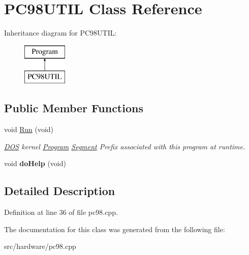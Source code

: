 \hypertarget{classPC98UTIL}{\section{P\-C98\-U\-T\-I\-L Class Reference}
\label{classPC98UTIL}
}
Inheritance diagram for P\-C98\-U\-T\-I\-L\-:\begin{figure}[H]
\begin{center}
\leavevmode
\includegraphics[height=2.000000cm]{classPC98UTIL}
\end{center}
\end{figure}
\subsection*{Public Member Functions}
\begin{DoxyCompactItemize}
\item 
\hypertarget{classPC98UTIL_a707ed1ec88edc877739dc492b9b2d752}{void \hyperlink{classPC98UTIL_a707ed1ec88edc877739dc492b9b2d752}{Run} (void)}\label{classPC98UTIL_a707ed1ec88edc877739dc492b9b2d752}

\begin{DoxyCompactList}\small\item\em \hyperlink{classDOS}{D\-O\-S} kernel \hyperlink{classProgram}{Program} \hyperlink{structSegment}{Segment} Prefix associated with this program at runtime. \end{DoxyCompactList}\item 
\hypertarget{classPC98UTIL_acfb7033342820a8d47b88310b7c4a27d}{void {\bfseries do\-Help} (void)}\label{classPC98UTIL_acfb7033342820a8d47b88310b7c4a27d}

\end{DoxyCompactItemize}


\subsection{Detailed Description}


Definition at line 36 of file pc98.\-cpp.



The documentation for this class was generated from the following file\-:\begin{DoxyCompactItemize}
\item 
src/hardware/pc98.\-cpp\end{DoxyCompactItemize}
